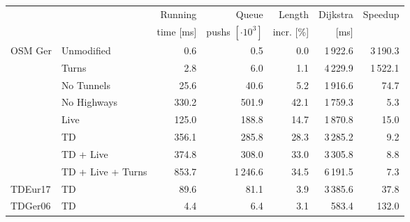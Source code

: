 \begin{tabular}{llrrrrr}
\toprule
 & &   Running &                Queue &     Length & Dijkstra & Speedup \\ & & time [ms] & pushs $[\cdot 10^3]$ & incr. [\%] &     [ms] &         \\
\midrule
OSM Ger & Unmodified &              0.6 &              0.5 &       0.0 &                    1\,922.6 &   3\,190.3 \\
        & Turns &              2.8 &              6.0 &       1.1 &                    4\,229.9 &   1\,522.1 \\
        & No Tunnels &             25.6 &             40.6 &       5.2 &                    1\,916.6 &     74.7 \\
        & No Highways &            330.2 &            501.9 &      42.1 &                    1\,759.3 &      5.3 \\
        & Live &            125.0 &            188.8 &      14.7 &                    1\,870.8 &     15.0 \\
        & TD &            356.1 &            285.8 &      28.3 &                    3\,285.2 &      9.2 \\
        & TD + Live &            374.8 &            308.0 &      33.0 &                    3\,305.8 &      8.8 \\
        & TD + Live + Turns &            853.7 &           1\,246.6 &      34.5 &                    6\,191.5 &      7.3 \\
\addlinespace
TDEur17 & TD &             89.6 &             81.1 &       3.9 &                    3\,385.6 &     37.8 \\
TDGer06 & TD &              4.4 &              6.4 &       3.1 &                     583.4 &    132.0 \\
\bottomrule
\end{tabular}


